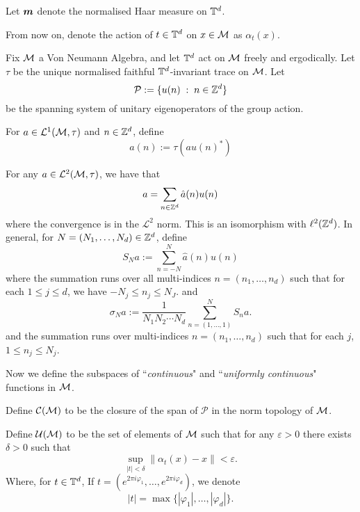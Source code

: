 Let $\boldsymbol{m}$ denote the normalised Haar measure on $\mathbb{T}^d$.

From now on, denote the action of $t \in \mathbb{T}^d$ on $x \in \mathcal{M}$ as $\alpha_t(x)$.

Fix $\mathcal{M}$ a Von Neumann Algebra, and let $\mathbb{T}^d$ act on $\mathcal{M}$ freely
and ergodically. Let $\tau$ be the unique normalised faithful $\mathbb{T}^d$-invariant trace
on $\mathcal{M}$. Let
\begin{equation}
    \mathcal{P} := \{ u(n) \;:\; n \in \mathbb{Z}^d\}
\end{equation}
be the spanning system of unitary eigenoperators of the group action. 

For $a \in \mathcal{L}^1(\mathcal{M},\tau)$ and $n \in \mathbb{Z}^d$, define
\begin{equation}
    \hat{a}(n) := \tau(au(n)^*)
\end{equation}

For any $a \in \mathcal{L}^2(\mathcal{M},\tau)$, we have that
\begin{equation}
    a = \sum_{n \in \mathbb{Z}^d} \hat{a}(n)u(n)
\end{equation}
where the convergence is in the $\mathcal{L}^2$ norm. This is
an isomorphism with $\ell^2(\mathbb{Z}^d)$.
In general, for $N = (N_1,\ldots,N_d) \in \mathbb{Z}^d$, define
\begin{equation}
    S_N a := \sum_{n = -N}^N \hat{a}(n)u(n)
\end{equation}
where the summation runs over all multi-indices $n = (n_1,\ldots,n_d)$
such that for each $1\leq j \leq d$, we have $-N_j \leq n_j \leq N_J$.
and
\begin{equation}
    \sigma_N a := \frac{1}{N_1N_2\cdots N_d}\sum_{n = (1,\ldots,1)}^N S_n a.
\end{equation}
and the summation runs over multi-indices $n = (n_1,\ldots,n_d)$
such that for each $j$, $1 \leq n_j \leq N_j$.

Now we define the subspaces of ``\emph{continuous}" and ``\emph{uniformly continuous}"
functions in $\mathcal{M}$. 
\begin{definition}
    Define $\mathcal{C}(\mathcal{M})$ to be the closure of the span of $\mathcal{P}$
    in the norm topology of $\mathcal{M}$.
    
    Define $\mathcal{U}(\mathcal{M})$ to be the set of elements of $\mathcal{M}$
    such that for any $\varepsilon > 0$ there exists $\delta > 0$ such that
    \begin{equation}
        \sup_{|t| < \delta} \|\alpha_t(x)-x\| < \varepsilon.    
    \end{equation}
    Where, for $t \in \mathbb{T}^d$, If $t = (e^{2\pi i\varphi_1},\ldots,e^{2\pi i\varphi_d})$, we 
    denote
    \begin{equation}
        |t| = \max\{|\varphi_1|,\ldots,|\varphi_d|\}.
    \end{equation}
\end{definition}

